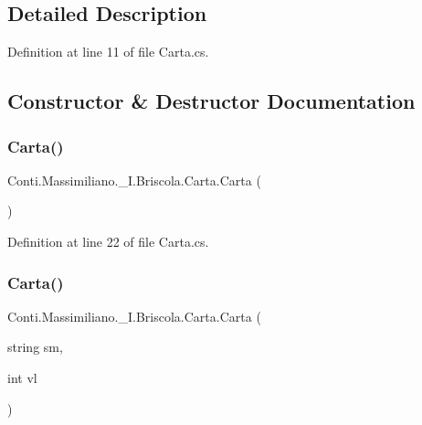 \subsection{Detailed Description}


Definition at line 11 of file Carta.\+cs.



\subsection{Constructor \& Destructor Documentation}
\hypertarget{class_conti_1_1_massimiliano_1_1__5_i_1_1_briscola_1_1_carta_a398eb93c05ff826b596e5c8dc37e5fc6}{}\label{class_conti_1_1_massimiliano_1_1__5_i_1_1_briscola_1_1_carta_a398eb93c05ff826b596e5c8dc37e5fc6} 
\subsubsection{\texorpdfstring{Carta()}{Carta()}\hspace{0.1cm}{\footnotesize\ttfamily [1/2]}}
{\footnotesize\ttfamily Conti.\+Massimiliano.\+\_\+I.\+Briscola.\+Carta.\+Carta (\begin{DoxyParamCaption}{ }\end{DoxyParamCaption})}



Definition at line 22 of file Carta.\+cs.

\hypertarget{class_conti_1_1_massimiliano_1_1__5_i_1_1_briscola_1_1_carta_a54051d98cf9c1acd72f1125310ba3cf6}{}\label{class_conti_1_1_massimiliano_1_1__5_i_1_1_briscola_1_1_carta_a54051d98cf9c1acd72f1125310ba3cf6} 
\subsubsection{\texorpdfstring{Carta()}{Carta()}\hspace{0.1cm}{\footnotesize\ttfamily [2/2]}}
{\footnotesize\ttfamily Conti.\+Massimiliano.\+\_\+I.\+Briscola.\+Carta.\+Carta (\begin{DoxyParamCaption}\item[{string}]{sm,  }\item[{int}]{vl }\end{DoxyParamCaption})}



